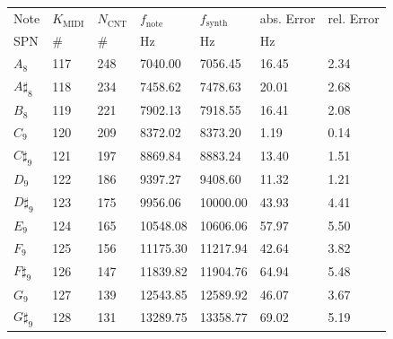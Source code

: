 \begin{tabularx}{\textwidth}{YYYYYYY}
	\toprule
	Note          & $K_\text{MIDI}$ & $N_\text{CNT}$ & $f_\text{note}$ & $f_\text{synth}$ & abs. Error  & rel. Error   \\
	\acs{SPN}     & \#              & \#             & \si{\hertz}     & \si{\hertz}      & \si{\hertz} & \si{\permil} \\ \midrule
	$A_{8}$       & 117             & 248            & 7040.00         & 7056.45          & 16.45       & 2.34         \\
	$A\sharp_{8}$ & 118             & 234            & 7458.62         & 7478.63          & 20.01       & 2.68         \\
	$B_{8}$       & 119             & 221            & 7902.13         & 7918.55          & 16.41       & 2.08         \\
	$C_{9}$       & 120             & 209            & 8372.02         & 8373.20          & 1.19        & 0.14         \\
	$C\sharp_{9}$ & 121             & 197            & 8869.84         & 8883.24          & 13.40       & 1.51         \\
	$D_{9}$       & 122             & 186            & 9397.27         & 9408.60          & 11.32       & 1.21         \\
	$D\sharp_{9}$ & 123             & 175            & 9956.06         & 10000.00         & 43.93       & 4.41         \\
	$E_{9}$       & 124             & 165            & 10548.08        & 10606.06         & 57.97       & 5.50         \\
	$F_{9}$       & 125             & 156            & 11175.30        & 11217.94         & 42.64       & 3.82         \\
	$F\sharp_{9}$ & 126             & 147            & 11839.82        & 11904.76         & 64.94       & 5.48         \\
	$G_{9}$       & 127             & 139            & 12543.85        & 12589.92         & 46.07       & 3.67         \\
	$G\sharp_{9}$ & 128             & 131            & 13289.75        & 13358.77         & 69.02       & 5.19         \\
	\bottomrule
\end{tabularx}
